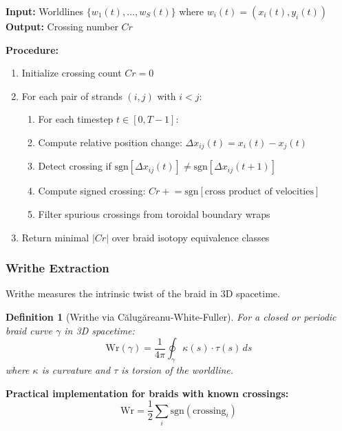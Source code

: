 \documentclass[11pt]{article}
\newtheorem{definition}[theorem]{Definition}
\theoremstyle{remark}
\begin{document}
\begin{tcolorbox}[colback=gray!5,colframe=gray!75!black,title=\textbf{Algorithm: Crossing Number Extraction}]
\textbf{Input:} Worldlines $\{w_1(t), \ldots, w_S(t)\}$ where $w_i(t) = (x_i(t), y_i(t))$ \\
\textbf{Output:} Crossing number $Cr$

\textbf{Procedure:}
\begin{enumerate}
    \item Initialize crossing count $Cr = 0$
    \item For each pair of strands $(i, j)$ with $i < j$:
    \begin{enumerate}
        \item For each timestep $t \in [0, T-1]$:
        \item Compute relative position change: $\Delta x_{ij}(t) = x_i(t) - x_j(t)$
        \item Detect crossing if $\text{sgn}[\Delta x_{ij}(t)] \neq \text{sgn}[\Delta x_{ij}(t+1)]$
        \item Compute signed crossing: $Cr \mathrel{+}= \text{sgn}[\text{cross product of velocities}]$
        \item Filter spurious crossings from toroidal boundary wraps
    \end{enumerate}
    \item Return minimal $|Cr|$ over braid isotopy equivalence classes
\end{enumerate}
\end{tcolorbox}

\subsubsection{Writhe Extraction}

Writhe measures the intrinsic twist of the braid in 3D spacetime.

\begin{definition}[Writhe via Călugăreanu-White-Fuller]
For a closed or periodic braid curve $\gamma$ in 3D spacetime:
\begin{equation}
\text{Wr}(\gamma) = \frac{1}{4\pi} \oint_{\gamma} \kappa(s) \cdot \tau(s) \, ds
\end{equation}
where $\kappa$ is curvature and $\tau$ is torsion of the worldline.
\end{definition}

\textbf{Practical implementation for braids with known crossings:}
\begin{equation}
\text{Wr} = \frac{1}{2} \sum_{i} \text{sgn}(\text{crossing}_i)
\end{equation}
\end{document}
